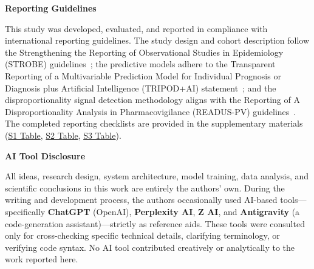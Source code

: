 \documentclass[10pt]{article}
\begin{document}

\noindent\textbf{Reporting Guidelines}

\noindent This study was developed, evaluated, and reported in compliance with international reporting guidelines. The study design and cohort description follow the Strengthening the Reporting of Observational Studies in Epidemiology (STROBE) guidelines~\cite{vonelm2007}; the predictive models adhere to the Transparent Reporting of a Multivariable Prediction Model for Individual Prognosis or Diagnosis plus Artificial Intelligence (TRIPOD+AI) statement~\cite{collins2024}; and the disproportionality signal detection methodology aligns with the Reporting of A Disproportionality Analysis in Pharmacovigilance (READUS-PV) guidelines~\cite{fusaroli2024}. The completed reporting checklists are provided in the supplementary materials (\hyperref[s1tab]{S1 Table}, \hyperref[s2tab]{S2 Table}, \hyperref[s3tab]{S3 Table}).

\noindent\textbf{AI Tool Disclosure}

\noindent All ideas, research design, system architecture, model training, data analysis, and scientific conclusions in this work are entirely the authors' own. During the writing and development process, the authors occasionally used AI-based tools---specifically \textbf{ChatGPT} (OpenAI), \textbf{Perplexity AI}, \textbf{Z AI}, and \textbf{Antigravity} (a code-generation assistant)---strictly as reference aids. These tools were consulted only for cross-checking specific technical details, clarifying terminology, or verifying code syntax. No AI tool contributed creatively or analytically to the work reported here.
\end{document}
